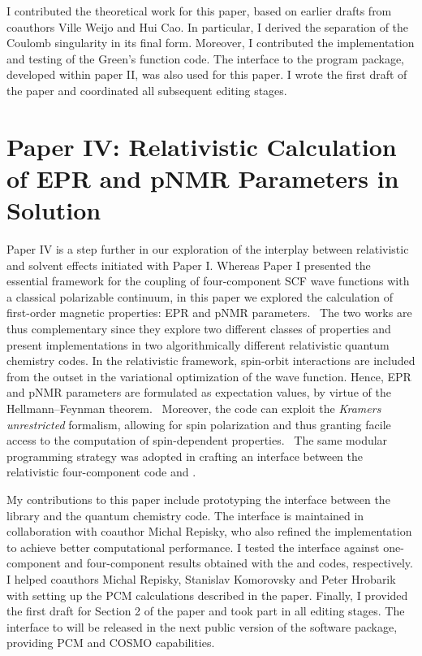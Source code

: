 I contributed the theoretical work for this paper, based on earlier drafts from coauthors
Ville Weijo and Hui Cao. In particular, I derived the separation of
the Coulomb singularity in its final form.
Moreover, I contributed the implementation and testing of the Green's function code.
The interface to the \LSDALTON program package, developed within paper II, was
also used for this paper.
I wrote the first draft of the paper and coordinated all subsequent editing stages.

\section*{Paper IV: Relativistic Calculation of EPR and pNMR Parameters in Solution}

Paper IV is a step further in our exploration of the interplay between
relativistic and solvent effects initiated with Paper I.
Whereas Paper I presented the essential framework for the coupling of
four-component \acs{SCF} wave functions with a classical polarizable continuum,
in this paper we explored the calculation of first-order magnetic properties:
\ac{EPR} and \ac{pNMR} parameters.~\autocite{Repisky2010-ls, Malkin2011-nm,
Komorovsky2013-xa, Cherry2016-ij}
The two works are thus complementary since they explore two different classes
of properties and present implementations in two algorithmically different
relativistic quantum chemistry codes.
In the relativistic framework, spin-orbit interactions are included from the
outset in the variational optimization of the wave function.
Hence, \acs{EPR} and \acs{pNMR} parameters are formulated as expectation
values, by virtue of the Hellmann--Feynman theorem.~\autocite{Konishi2009-zb,
Helgaker2000-tz}
Moreover, the \ReSpect code can exploit the \emph{Kramers unrestricted} formalism,
allowing for spin polarization and thus granting facile access to the computation
of spin-dependent properties.~\autocite{Dyall2007-tu}
The same modular programming strategy was adopted in crafting an interface between the
relativistic four-component code \ReSpect\autocite{ReSpect-3.5.0} and \pcmsolver.

My contributions to this paper include prototyping the interface between the
\pcmsolver library and the \ReSpect quantum chemistry code.
The interface is maintained in collaboration with coauthor Michal Repisky, who also
refined the implementation to achieve better computational performance.
I tested the interface against one-component and four-component results obtained with
the \LSDALTON and \DIRAC codes, respectively.
I helped coauthors Michal Repisky, Stanislav Komorovsky and Peter Hrobarik
with setting up the \acs{PCM} calculations described in the paper.
Finally, I provided the first draft for Section 2 of the paper and took part in all editing stages.
The interface to \ReSpect will be released in the next public version of the software
package, providing \acs{PCM} and \acs{COSMO} capabilities.

